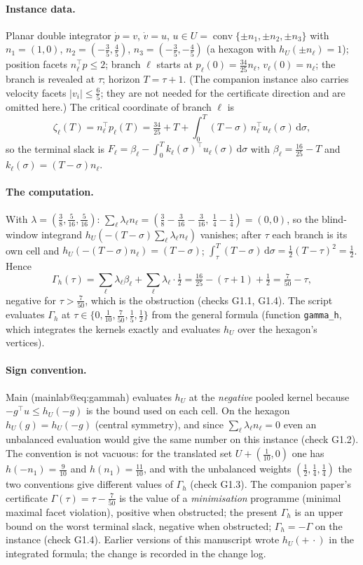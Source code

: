 \documentclass[11pt,a4paper]{article}
\makeatletter
\theoremstyle{plain}
\theoremstyle{definition}
\theoremstyle{remark}
\newcommand{\conv}{\operatorname{conv}}
\newcommand{\tfr}[2]{\tfrac{#1}{#2}}
\newcommand{\dd}{\,\mathrm{d}}
\newcommand{\mref}[1]{\csname mainlab@#1\endcsname}
\newcommand{\meqref}[1]{(\mref{#1})}
\makeatother
\begin{document}
\paragraph{Instance data.} Planar double integrator $\dot p=v$, $\dot v=u$, $u\in U=\conv\{\pm n_1,\pm n_2,\pm n_3\}$ with $n_1=(1,0)$, $n_2=(-\tfr35,\tfr45)$, $n_3=(-\tfr35,-\tfr45)$ (a hexagon with $h_U(\pm n_\ell)=1$); position facets $n_\ell^\top p\le2$; branch $\ell$ starts at $p_\ell(0)=\tfr{34}{25}n_\ell$, $v_\ell(0)=n_\ell$; the branch is revealed at $\tau$; horizon $T=\tau+1$. (The companion instance also carries velocity facets $|v_i|\le\tfr65$; they are not needed for the certificate direction and are omitted here.) The critical coordinate of branch $\ell$ is
\[
\zeta_\ell(T)=n_\ell^\top p_\ell(T)=\tfr{34}{25}+T+\int_0^T(T-\sigma)\,n_\ell^\top u_\ell(\sigma)\dd\sigma,
\]
so the terminal slack is $F_\ell=\beta_\ell-\int_0^Tk_\ell(\sigma)^\top u_\ell(\sigma)\dd\sigma$ with $\beta_\ell=\tfr{16}{25}-T$ and $k_\ell(\sigma)=(T-\sigma)n_\ell$.

\paragraph{The computation.} With $\lambda=(\tfr38,\tfr5{16},\tfr5{16})$: $\sum_\ell\lambda_\ell n_\ell=(\tfr38-\tfr3{16}-\tfr3{16},\ \tfr14-\tfr14)=(0,0)$, so the blind-window integrand $h_U(-(T-\sigma)\sum_\ell\lambda_\ell n_\ell)$ vanishes; after $\tau$ each branch is its own cell and $h_U(-(T-\sigma)n_\ell)=(T-\sigma)$; $\int_\tau^{T}(T-\sigma)\dd\sigma=\tfr12(T-\tau)^2=\tfr12$. Hence
\[
\Gamma_h(\tau)=\sum_\ell\lambda_\ell\beta_\ell+\sum_\ell\lambda_\ell\cdot\tfr12=\tfr{16}{25}-(\tau+1)+\tfr12=\tfr7{50}-\tau ,
\]
negative for $\tau>\tfr7{50}$, which is the obstruction (checks G1.1, G1.4). The script evaluates $\Gamma_h$ at $\tau\in\{0,\tfr1{10},\tfr7{50},\tfr15,\tfr12\}$ from the general formula (function \texttt{gamma\_h}, which integrates the kernels exactly and evaluates $h_U$ over the hexagon's vertices).

\paragraph{Sign convention.} Main \meqref{eq:gammah} evaluates $h_U$ at the \emph{negative} pooled kernel because $-g^\top u\le h_U(-g)$ is the bound used on each cell. On the hexagon $h_U(g)=h_U(-g)$ (central symmetry), and since $\sum_\ell\lambda_\ell n_\ell=0$ even an unbalanced evaluation would give the same number on this instance (check G1.2). The convention is not vacuous: for the translated set $U+(\tfr1{10},0)$ one has $h(-n_1)=\tfr9{10}$ and $h(n_1)=\tfr{11}{10}$, and with the unbalanced weights $(\tfr12,\tfr14,\tfr14)$ the two conventions give different values of $\Gamma_h$ (check G1.3). The companion paper's certificate $\Gamma(\tau)=\tau-\tfr7{50}$ is the value of a \emph{minimisation} programme (minimal maximal facet violation), positive when obstructed; the present $\Gamma_h$ is an upper bound on the worst terminal slack, negative when obstructed; $\Gamma_h=-\Gamma$ on the instance (check G1.4). Earlier versions of this manuscript wrote $h_U(+\,\cdot)$ in the integrated formula; the change is recorded in the change log.
\end{document}
